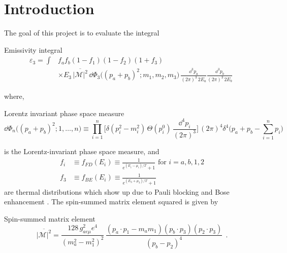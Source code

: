 \section{Introduction}
\label{sec:introduction}
The goal of this project is to evaluate the integral 

\begin{bluenv}{Emissivity integral}
    \begin{equation}
    \label{eq:emissivity-integral}
    \begin{aligned}
        \varepsilon_3 = \int 
            & f_a f_b (1 - f_1) (1 - f_2) (1 + f_3) \\
            &\times E_3 \,
            \overline{| \mathcal{M} |^2} \,
            \dd \Phi_3 \big( (p_a + p_b)^2; m_1, m_2, m_3 \big)
            \,
            \frac{\dd^3 p_a}{(2\pi)^3\,2 E_a}
            \frac{\dd^3 p_b}{(2\pi)^3\,2 E_b} 
            \; 
    \end{aligned}
    \end{equation}
\end{bluenv}
where, 
\begin{bluenv}{Lorentz invariant phase space measure}
    \begin{equation}
        \label{eq:LIPS}
        \dd \Phi_n \big((p_a + p_b)^2; 1, \ldots, n \big) \equiv 
        \prod_{i=1}^{n}
        \bigg[
             \delta (p_i^2 - m_i^2) \, \Theta(p_i^0) \, 
            \frac{\dd^4 p_i}{(2\pi)^3}
        \bigg] \, (2\pi)^4 \delta^4 
        \bigg( 
            p_a + p_b - \sum_{i=1}^{n} p_i
        \bigg) \quad 
    \end{equation}
\end{bluenv}
is the Lorentz-invariant phase space measure, and
\begin{align}
    f_i &\equiv f_{FD}(E_i) \equiv \frac{1}{e^{(E_i - \mu_i)/T} + 1} \text{ for } i = a, b, 1, 2 \label{eq:fermi-dirac}\\
    f_3 &\equiv f_{BE}(E_i) \equiv \frac{1}{e^{(E_3 + \mu_3)/T} + 1} \label{eq:bose-einstein}
\end{align}
are thermal distributions which show up due to Pauli blocking and Bose enhancement . 
The spin-summed matrix element squared is given by
\begin{bluenv}{Spin-summed matrix element}
    \begin{equation}
        \label{eq:matrix-element}
        \overline{| \mathcal{M} |^2} 
            = 
            \frac{128 \, g^2_{ae\mu} e^4}{(m_a^2 - m_1^2)^2} \,
            \frac{
                 (p_a \cdot p_1 - m_a m_1)
                (p_b \cdot p_3)
                (p_2 \cdot p_3)
            }
            {
                (p_b - p_2)^4
            } \; \, .
    \end{equation}
\end{bluenv}

